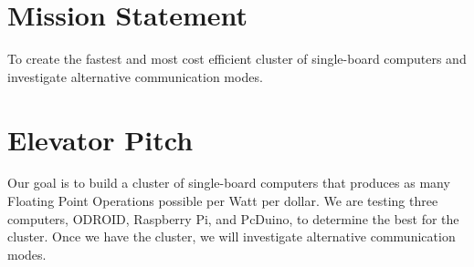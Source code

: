
\section{Mission Statement}
To create the fastest and most cost efficient cluster of single-board computers and investigate alternative communication modes.

\section{Elevator Pitch}

Our goal is to build a cluster of single-board computers that produces as many Floating Point Operations possible per Watt per dollar. We are testing three computers, ODROID, Raspberry Pi, and PcDuino, to determine the best for the cluster. Once we have the cluster, we will investigate alternative communication modes.

